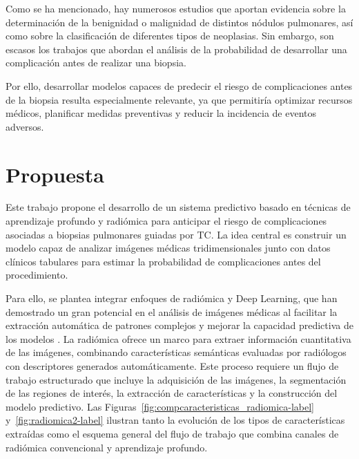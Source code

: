 Como se ha mencionado, hay numerosos estudios que aportan evidencia sobre la determinación de la benignidad o malignidad de distintos nódulos pulmonares, así como sobre la clasificación de diferentes tipos de neoplasias. Sin embargo, son escasos los trabajos que abordan el análisis de la probabilidad de desarrollar una complicación antes de realizar una biopsia.

Por ello, desarrollar modelos capaces de predecir el riesgo de complicaciones antes de la biopsia resulta especialmente relevante, ya que permitiría optimizar recursos médicos, planificar medidas preventivas y reducir la incidencia de eventos adversos.



\section{Propuesta}

Este trabajo propone el desarrollo de un sistema predictivo basado en técnicas de aprendizaje profundo y radiómica para anticipar el riesgo de complicaciones asociadas a biopsias pulmonares guiadas por TC. La idea central es construir un modelo capaz de analizar imágenes médicas tridimensionales junto con datos clínicos tabulares para estimar la probabilidad de complicaciones antes del procedimiento.

Para ello, se plantea integrar enfoques de radiómica y Deep Learning, que han demostrado un gran potencial en el análisis de imágenes médicas al facilitar la extracción automática de patrones complejos y mejorar la capacidad predictiva de los modelos \parencite{shen2017deep}. La radiómica ofrece un marco para extraer información cuantitativa de las imágenes, combinando características semánticas evaluadas por radiólogos con descriptores generados automáticamente. Este proceso requiere un flujo de trabajo estructurado que incluye la adquisición de las imágenes, la segmentación de las regiones de interés, la extracción de características y la construcción del modelo predictivo. Las Figuras~\ref{fig:compcaracteristicas_radiomica-label} y~\ref{fig:radiomica2-label} ilustran tanto la evolución de los tipos de características extraídas como el esquema general del flujo de trabajo que combina canales de radiómica convencional y aprendizaje profundo.

